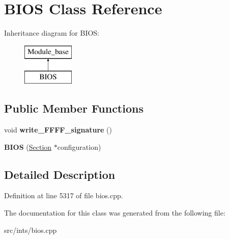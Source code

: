 \hypertarget{classBIOS}{\section{B\-I\-O\-S Class Reference}
\label{classBIOS}
}
Inheritance diagram for B\-I\-O\-S\-:\begin{figure}[H]
\begin{center}
\leavevmode
\includegraphics[height=2.000000cm]{classBIOS}
\end{center}
\end{figure}
\subsection*{Public Member Functions}
\begin{DoxyCompactItemize}
\item 
\hypertarget{classBIOS_ae2cf67c9872366656b32695ce56b3c0a}{void {\bfseries write\-\_\-\-F\-F\-F\-F\-\_\-signature} ()}\label{classBIOS_ae2cf67c9872366656b32695ce56b3c0a}

\item 
\hypertarget{classBIOS_a04ed247011d175b84c556487820fd64c}{{\bfseries B\-I\-O\-S} (\hyperlink{classSection}{Section} $\ast$configuration)}\label{classBIOS_a04ed247011d175b84c556487820fd64c}

\end{DoxyCompactItemize}


\subsection{Detailed Description}


Definition at line 5317 of file bios.\-cpp.



The documentation for this class was generated from the following file\-:\begin{DoxyCompactItemize}
\item 
src/ints/bios.\-cpp\end{DoxyCompactItemize}
